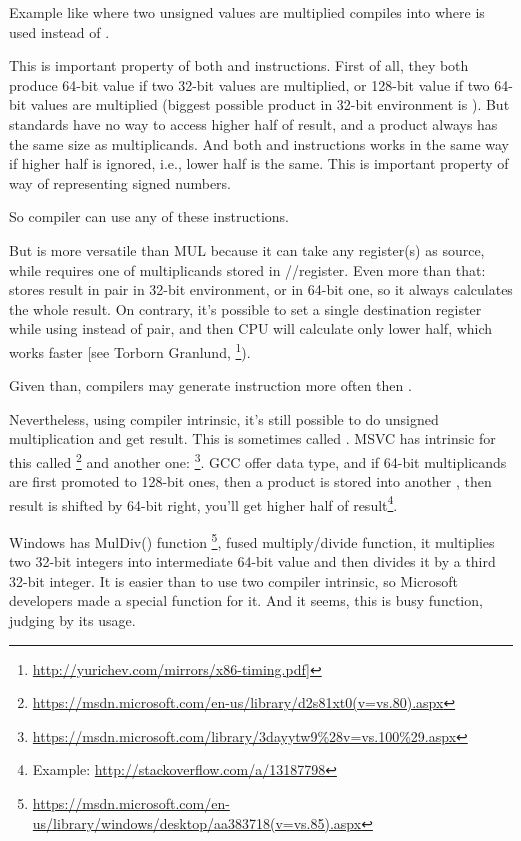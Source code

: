 \label{IMUL_over_MUL}

Example like  where two unsigned values are multiplied compiles into  where \IMUL is used instead of \MUL.

This is important property of both \MUL and \IMUL instructions.
First of all, they both produce 64-bit value if two 32-bit values are multiplied, or 128-bit value if two 64-bit values are multiplied (biggest possible \gls{product} in 32-bit environment is ).
But \CCpp standards have no way to access higher half of result, and a \gls{product} always has the same size as multiplicands. %
And both \MUL and \IMUL instructions works in the same way if higher half is ignored, i.e., lower half is the same.
This is important property of  way of representing signed numbers.

So \CCpp compiler can use any of these instructions.

But \IMUL is more versatile than MUL because it can take any register(s) as source, while \MUL requires one of multiplicands stored in \AX/\EAX/\RAX register.
Even more than that: \MUL stores result in  pair in 32-bit environment, or  in 64-bit one, so it always calculates the whole result.
On contrary, it's possible to set a single destination register while using \IMUL instead of pair, and then \ac{CPU} will calculate only lower half, which works faster [see Torborn Granlund, \footnote{\url{http://yurichev.com/mirrors/x86-timing.pdf}]}).

Given than, \CCpp compilers may generate \IMUL instruction more often then \MUL.

Nevertheless, using compiler intrinsic, it's still possible to do unsigned multiplication and get  result.
This is sometimes called .
MSVC has intrinsic for this called \footnote{\url{https://msdn.microsoft.com/en-us/library/d2s81xt0(v=vs.80).aspx}} and another one: \footnote{\url{https://msdn.microsoft.com/library/3dayytw9%28v=vs.100%29.aspx}}.
GCC offer  data type, and if 64-bit multiplicands are first promoted to 128-bit ones,
then a \gls{product} is stored into another , then result is shifted by 64-bit right, you'll get higher half of result\footnote{Example: \url{http://stackoverflow.com/a/13187798}}.


Windows has MulDiv() function
\footnote{\url{https://msdn.microsoft.com/en-us/library/windows/desktop/aa383718(v=vs.85).aspx}},
fused multiply/divide function, it multiplies two 32-bit integers into intermediate 64-bit value
and then divides it by a third 32-bit integer.
It is easier than to use two compiler intrinsic, so Microsoft developers made a special function for it.
And it seems, this is busy function, judging by its usage.

